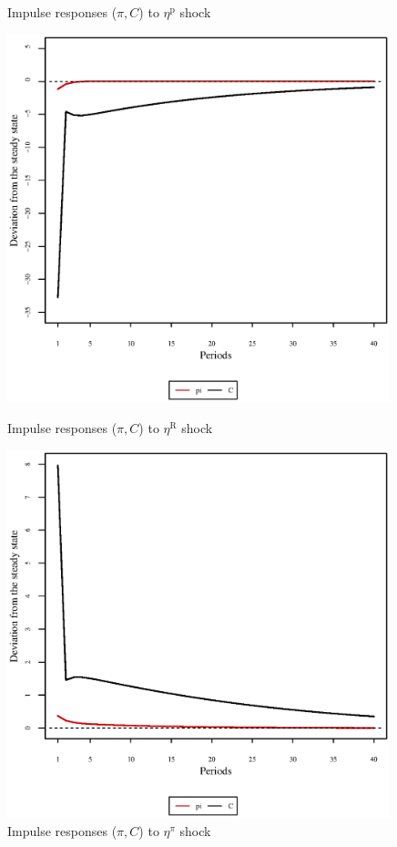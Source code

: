 \begin{figure}[h]
\begin{minipage}{0.5\textwidth}
\caption{Impulse responses ($\pi, C$) to $\eta^{\mathrm{p}}$ shock}
\end{minipage}
\end{figure}

\begin{figure}[h]
\begin{minipage}{0.5\textwidth}
\vspace*{-3em}
\centering
\includegraphics[width=0.99\textwidth, scale=0.55]{plots/plot_78.eps}
\caption{Impulse responses ($\pi, C$) to $\eta^{\mathrm{R}}$ shock}
\end{minipage}
\begin{minipage}{0.5\textwidth}
\vspace*{-3em}
\centering
\includegraphics[width=0.99\textwidth, scale=0.55]{plots/plot_79.eps}
\caption{Impulse responses ($\pi, C$) to $\eta^{\pi}$ shock}
\end{minipage}
\end{figure}

